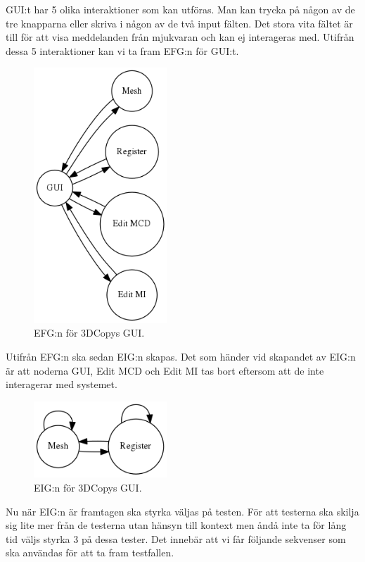 GUI:t har 5 olika interaktioner som kan utföras. Man kan trycka på någon av de tre knapparna eller skriva i någon av de två input fälten. Det stora vita fältet är till för att visa meddelanden från mjukvaran och kan ej interageras med. Utifrån dessa 5 interaktioner kan vi ta fram EFG:n för GUI:t.

\begin{figure}[H]
	\centering
	\includegraphics[width=50mm]{figures/3DCopyGUIEFG.png}
	\caption{EFG:n för 3DCopys GUI.}
	\label{fig:3dcopy_guiefg}
\end{figure}

Utifrån EFG:n ska sedan EIG:n skapas. Det som händer vid skapandet av EIG:n är att noderna GUI, Edit MCD och Edit MI tas bort eftersom att de inte interagerar med systemet.

\begin{figure}[H]
	\centering
	\includegraphics[width=50mm]{figures/3DCopyGUIEIG.png}
	\caption{EIG:n för 3DCopys GUI.}
	\label{fig:3dcopy_guieig}
\end{figure}

Nu när EIG:n är framtagen ska styrka väljas på testen. För att testerna ska skilja sig lite mer från de testerna utan hänsyn till kontext men åndå inte ta för lång tid väljs styrka 3 på dessa tester. Det innebär att vi får följande sekvenser som ska användas för att ta fram testfallen.

